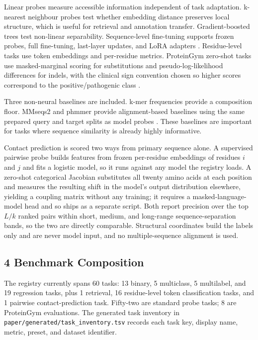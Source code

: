 \documentclass[
]{article}
\begin{document}
Linear probes measure accessible information independent of task
adaptation. k-nearest neighbour probes test whether embedding distance
preserves local structure, which is useful for retrieval and annotation
transfer. Gradient-boosted trees test non-linear separability.
Sequence-level fine-tuning supports frozen probes, full fine-tuning,
last-layer updates, and LoRA adapters \autocite{hu2021lora}.
Residue-level tasks use token embeddings and per-residue metrics.
ProteinGym zero-shot tasks use masked-marginal scoring for substitutions
and pseudo-log-likelihood differences for indels, with the clinical sign
convention chosen so higher scores correspond to the positive/pathogenic
class \autocite{notin2023proteingym}.

Three non-neural baselines are included. k-mer frequencies provide a
composition floor. MMseqs2 and phmmer provide alignment-based baselines
using the same prepared query and target splits as model probes
\autocite{steinegger2017mmseqs2,eddy2011accelerated,larralde2023pyhmmer}.
These baselines are important for tasks where sequence similarity is
already highly informative.

Contact prediction is scored two ways from primary sequence alone. A
supervised pairwise probe builds features from frozen per-residue
embeddings of residues \(i\) and \(j\) and fits a logistic model, so it
runs against any model the registry loads. A zero-shot categorical
Jacobian substitutes all twenty amino acids at each position and measures
the resulting shift in the model's output distribution elsewhere,
yielding a coupling matrix without any training; it requires a
masked-language-model head and so ships as a separate script. Both report
precision over the top \(L/k\) ranked pairs within short, medium, and
long-range sequence-separation bands, so the two are directly comparable.
Structural coordinates build the labels only and are never model input,
and no multiple-sequence alignment is used.

\subsection{4 Benchmark Composition}\label{benchmark-composition}

The registry currently spans 60 tasks: 13 binary, 5 multiclass, 5
multilabel, and 19 regression tasks, plus 1 retrieval, 16
residue-level token classification tasks, and 1 pairwise
contact-prediction task. Fifty-two are standard probe
tasks; 8 are ProteinGym evaluations. The generated task inventory in
\texttt{paper/generated/task\_inventory.tsv} records each task key,
display name, metric, preset, and dataset identifier.
\end{document}
